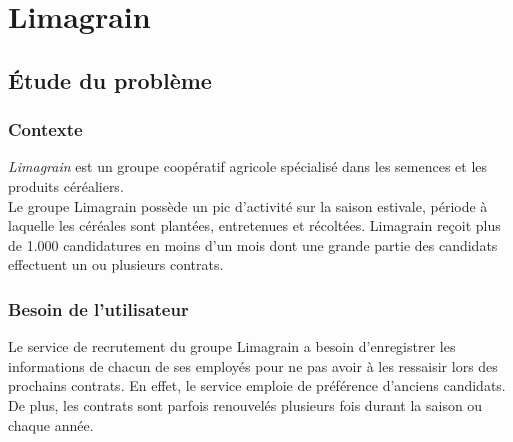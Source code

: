 \cleardoublepage

\chapter{Limagrain}


\section{Étude du problème}


\subsection{Contexte}

\textit{Limagrain} est un groupe coopératif agricole spécialisé dans les semences et les produits céréaliers.
\\

Le groupe Limagrain possède un pic d'activité sur la saison estivale, période à laquelle les céréales sont plantées, entretenues et récoltées.
Limagrain reçoit plus de 1.000 candidatures en moins d'un mois dont une grande partie des candidats effectuent un ou plusieurs contrats.


\subsection{Besoin de l'utilisateur}

Le service de recrutement du groupe Limagrain a besoin d'enregistrer les informations de chacun de ses employés pour ne pas avoir à les ressaisir lors des prochains contrats.
En effet, le service emploie de préférence d'anciens candidats.
De plus, les contrats sont parfois renouvelés plusieurs fois durant la saison ou chaque année.

